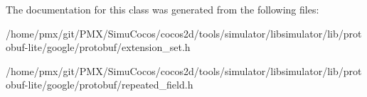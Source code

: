 The documentation for this class was generated from the following files\+:\begin{DoxyCompactItemize}
\item 
/home/pmx/git/\+P\+M\+X/\+Simu\+Cocos/cocos2d/tools/simulator/libsimulator/lib/protobuf-\/lite/google/protobuf/extension\+\_\+set.\+h\item 
/home/pmx/git/\+P\+M\+X/\+Simu\+Cocos/cocos2d/tools/simulator/libsimulator/lib/protobuf-\/lite/google/protobuf/repeated\+\_\+field.\+h\end{DoxyCompactItemize}
